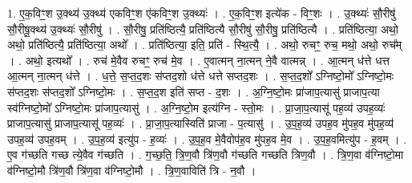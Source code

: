 \documentclass[17pt]{extarticle}
\begin{document}
1. ए॒क॒विꣳ॒॒श उ॒क्थ्य॑ उ॒क्थ्य॑ एकविꣳ॒॒श ए॑कविꣳ॒॒श उ॒क्थ्यः॑ । . ए॒क॒विꣳ॒॒श इत्ये॑क - विꣳ॒॒शः । . उ॒क्थ्यः॑ सौ॒रीषु॑ सौ॒रीषू॒क्थ्य॑ उ॒क्थ्यः॑ सौ॒रीषु॑ । . सौ॒रीषु॒ प्रति॑ष्ठित्यै॒ प्रति॑ष्ठित्यै सौ॒रीषु॑ सौ॒रीषु॒ प्रति॑ष्ठित्यै । . प्रति॑ष्ठित्या॒ अथो॒ अथो॒ प्रति॑ष्ठित्यै॒ प्रति॑ष्ठित्या॒ अथो᳚ । . प्रति॑ष्ठित्या॒ इति॒ प्रति॑ - स्थि॒त्यै॒ । . अथो॒ रुचꣳ॒॒ रुच॒ मथो॒ अथो॒ रुच᳚म् । . अथो॒ इत्यथो᳚ । . रुच॑ मे॒वैव रुचꣳ॒॒ रुच॑ मे॒व । . ए॒वात्मन् ना॒त्मन् ने॒वै वात्मन्न् । . आ॒त्मन् ध॑त्ते धत्त आ॒त्मन् ना॒त्मन् ध॑त्ते । . ध॒त्ते॒ स॒प्त॒द॒शः स॑प्तद॒शो ध॑त्ते धत्ते सप्तद॒शः । . स॒प्त॒द॒शो᳚ ऽग्निष्टो॒मो᳚ ऽग्निष्टो॒मः स॑प्तद॒शः स॑प्तद॒शो᳚ ऽग्निष्टो॒मः । . स॒प्त॒द॒श इति॑ सप्त - द॒शः । . अ॒ग्नि॒ष्टो॒मः प्रा॑जाप॒त्यासु॑ प्राजाप॒त्या स्व॑ग्निष्टो॒मो᳚ ऽग्निष्टो॒मः प्रा॑जाप॒त्यासु॑ । . अ॒ग्नि॒ष्टो॒म इत्य॑ग्नि - स्तो॒मः । . प्रा॒जा॒प॒त्यासू॑ पह॒व्य॑ उपह॒व्यः॑ प्राजाप॒त्यासु॑ प्राजाप॒त्यासू॑ पह॒व्यः॑ । . प्रा॒जा॒प॒त्यास्विति॑ प्राजा - प॒त्यासु॑ । . उ॒प॒ह॒व्य॑ उपह॒व मु॑पह॒व मु॑पह॒व्य॑ उपह॒व्य॑ उपह॒वम् । . उ॒प॒ह॒व्य॑ इत्यु॑प - ह॒व्यः॑ । . उ॒प॒ह॒व मे॒वैवोप॑ह॒व मु॑पह॒व मे॒व । . उ॒प॒ह॒वमित्यु॑प - ह॒वम् । . ए॒व ग॑च्छति गच्छ त्ये॒वैव ग॑च्छति । . ग॒च्छ॒ति॒ त्रि॒ण॒वौ त्रि॑ण॒वौ ग॑च्छति गच्छति त्रिण॒वौ । . त्रि॒ण॒वा व॑ग्निष्टो॒मा व॑ग्निष्टो॒मौ त्रि॑ण॒वौ त्रि॑ण॒वा व॑ग्निष्टो॒मौ । . त्रि॒ण॒वाविति॑ त्रि - न॒वौ । \newline
\end{document}
